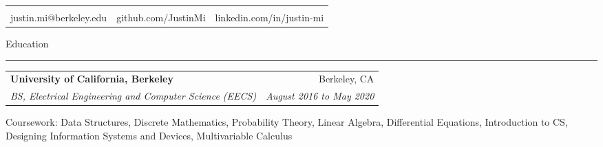 \documentclass[11pt,letterpaper]{article}
\makeatletter
\newenvironment{topic}[1]
    {
    \tabto{225pt}
    \large #1
    \vspace*{0.03in}
    \hrule 
    \vspace*{0.05in}
    }
    {
    }
\newenvironment{event}
    {
    \begin{tabular*}{\textwidth}{l@{\extracolsep{\fill}}r}
    }
    {
    \end{tabular*}
    }
\newenvironment{detail}
    {
    \normalsize
    }
    {
    \vspace*{0.02in}
    }
\newenvironment{head}
    {
    \begin{center}
    \begin{tabular*}{\textwidth}{@{\extracolsep{\fill}} l c r}
    }
    {
    \hline
    \hline
    \end{tabular*}
    \end{center}
    }
\makeatother
\begin{document}
    \begin{head}
                           & \huge{\textbf{\sc{Justin Mi}}} \\
    justin.mi@berkeley.edu & github.com/JustinMi & linkedin.com/in/justin-mi \\
    \end{head}





    \begin{topic}{Education}
        \begin{event}
            \textbf{University of California, Berkeley} & Berkeley, CA \\
            \emph{BS, Electrical Engineering and Computer Science (EECS)} & \emph{August 2016 to May 2020}        
        \end{event}
            \begin{detail}
                Coursework: Data Structures, Discrete Mathematics, Probability Theory,  Linear Algebra, Differential Equations, Introduction to CS, Designing Information Systems and Devices, Multivariable Calculus            
            \end{detail}
    \end{topic} \vspace*{0.1in}
\end{document}
